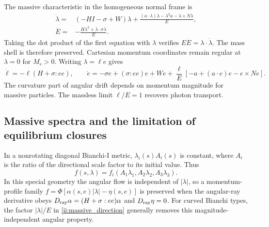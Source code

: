 The massive characteristic in the homogeneous normal frame is
\begin{align}
 \dot\lambda={}&(-HI-\sigma+W)\lambda
 +\frac{(a\cdot\lambda)\lambda-\lambda^2a-\lambda\times N\lambda}{E},
 \nonumber\\
 \dot E={}&-\frac{H\lambda^2+\lambda\cdot\sigma\lambda}{E}.
 \label{ii:massive_characteristic}
\end{align}
Taking the dot product of the first equation with $\lambda$ verifies $E\dot E=\lambda\cdot\dot\lambda$. The mass shell is therefore preserved. Cartesian momentum coordinates remain regular at $\lambda=0$ for $M_r>0$. Writing $\lambda=\ell e$ gives
\begin{equation}
 \dot\ell=-\ell(H+\sigma:ee),\qquad
 \dot e=-\sigma e+(\sigma:ee)e+We
 +\frac\ell E[-a+(a\cdot e)e-e\times Ne].
 \label{ii:massive_direction}
\end{equation}
The curvature part of angular drift depends on momentum magnitude for massive particles. The massless limit $\ell/E=1$ recovers photon transport.


\subsection{Massive spectra and the limitation of equilibrium closures}
In a nonrotating diagonal Bianchi-I metric, $\lambda_i(s)A_i(s)$ is constant, where $A_i$ is the ratio of the directional scale factor to its initial value. Thus
\begin{equation}
 f(s,\lambda)=f_i(A_1\lambda_1,A_2\lambda_2,A_3\lambda_3).
 \label{ii:massive_BI_solution}
\end{equation}
In this special geometry the angular flow is independent of $|\lambda|$, so a momentum-profile family $f=\Phi[\alpha(s,e)|\lambda|-\eta(s,e)]$ is preserved when the angular-ray derivative obeys $D_{\rm ray}\alpha=(H+\sigma:ee)\alpha$ and $D_{\rm ray}\eta=0$. For curved Bianchi types, the factor $|\lambda|/E$ in \eqref{ii:massive_direction} generally removes this magnitude-independent angular property.

